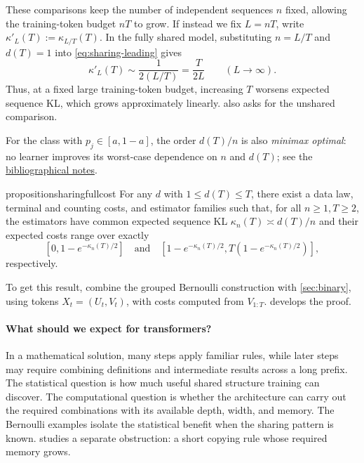 \documentclass[11pt,twoside]{article}
\theoremstyle{definition}
\theoremstyle{remark}
\begin{document}
These comparisons keep the number of independent sequences \(n\)
fixed, allowing the training-token budget \(nT\) to grow.
If instead we fix \(L=nT\), write
\(\kappa'_L(T):=\kappa_{L/T}(T)\). In the fully shared model,
substituting \(n=L/T\) and \(d(T)=1\) into \cref{eq:sharing-leading}
gives
\begin{equation}
 \kappa'_L(T)\sim\frac{1}{2(L/T)}=\frac{T}{2L}
 \qquad(L\to\infty).
 \label{eq:fixed-token-sharing}
\end{equation}
Thus, at a fixed large training-token budget, increasing \(T\)
worsens expected sequence KL, which grows approximately linearly.
 also asks for the unshared comparison.

For the class with \(p_j\in[a,1-a]\), the order \(d(T)/n\) is also
\emph{minimax optimal}: no learner improves its worst-case dependence
on \(n\) and \(d(T)\); see the \hyperref[note:sharing-minimax]{bibliographical notes}.

\begin{restatable}{proposition}{sharingfullcost}
\label{prop:sharing-full-cost}
For any \(d\) with \(1\le d(T)\le T\), there exist a data law,
terminal and counting costs, and estimator families such that, for all
\(n\ge1,T\ge2\), the estimators have common expected sequence KL
\(\kappa_n(T)\asymp d(T)/n\) and their expected costs range over exactly
\[
 \left[0,1-e^{-\kappa_n(T)/2}\right]
 \quad\text{and}\quad
 \left[1-e^{-\kappa_n(T)/2},T(1-e^{-\kappa_n(T)/2})\right],
\]
respectively.
\end{restatable}
To get this result,
combine the grouped Bernoulli construction with \cref{sec:binary},
using tokens \(X_t=(U_t,V_t)\), with costs computed from \(V_{1:T}\).
 develops the proof.

\paragraph{What should we expect for transformers?}
In a mathematical solution, many steps apply familiar rules, while
later steps may require combining definitions and intermediate results
across a long prefix. The statistical question is how much useful shared
structure training can discover. The computational question is whether
the architecture can carry out the required combinations with its
available depth, width, and memory.
The Bernoulli examples isolate the statistical benefit when the sharing
pattern is known.  studies a separate
obstruction: a short copying rule whose required memory grows.
\end{document}
